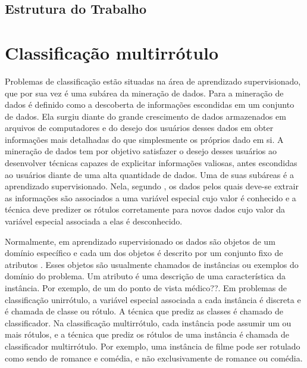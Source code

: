 \section{Estrutura do Trabalho}

\chapter{Classificação multirrótulo}

Problemas de classificação estão situadas na área de aprendizado supervisionado, que por sua vez é uma 
subárea da mineração de dados. Para \cite{dunham2003introductory} a mineração de dados é definido como a descoberta
de informações escondidas em um conjunto de dados. Ela surgiu diante do grande crescimento de dados armazenados
em arquivos de computadores e do desejo dos usuários desses dados em obter informações mais detalhadas do que simplesmente
os próprios dado em si. A mineração de dados tem por objetivo satisfazer o desejo desses usuários ao desenvolver técnicas
capazes de explicitar informações valiosas, antes escondidas ao usuários diante de uma alta quantidade de dados.
Uma de suas subáreas é a aprendizado supervisionado. Nela, segundo \cite{mohri2012foundations},
os dados pelos quais deve-se extrair as informações são associados a uma variável especial cujo valor
é conhecido e a técnica deve predizer os rótulos
corretamente para novos dados cujo valor da variável especial associada a elas é desconhecido.

Normalmente, em aprendizado supervisionado os dados são objetos de um domínio específico e cada um dos objetos
é descrito por um conjunto fixo de atributos \cite{rezende2003sistemas}. 
Esses objetos são usualmente chamados de instâncias ou exemplos do domínio do problema.
Um atributo é uma descrição de uma característica da instância.
Por exemplo, de um do ponto de vista médico??.
Em problemas de classificação unirrótulo, a variável especial associada a cada instância é discreta
e é chamada de classe ou rótulo. A técnica que prediz as classes é chamado de classificador.
Na classificação multirrótulo, cada instância pode assumir um ou mais rótulos, e a técnica
que prediz os rótulos de uma instância é chamada de classificador multirrótulo.
Por exemplo, uma instância de filme pode ser rotulado como sendo de romance e comédia, 
e não exclusivamente de romance ou comédia.


